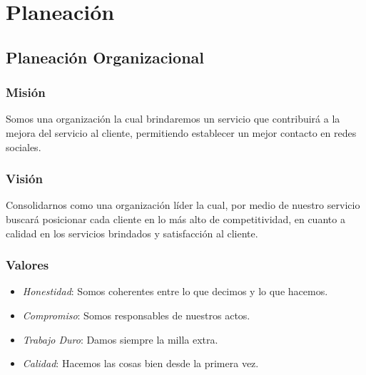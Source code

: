 \chapter{Planeaci\'on}
\section{Planeaci\'on Organizacional}
\subsection{Misi\'on}
Somos una organizaci\'on la cual brindaremos un servicio que  contribuir\'a a la mejora del servicio al  cliente, permitiendo establecer un mejor contacto en redes sociales.%
%
\subsection{Visi\'on}
Consolidarnos como una organizaci\'on l\'ider la cual, por medio de nuestro servicio buscar\'a posicionar cada cliente en lo m\'as alto de competitividad, en cuanto a calidad en los servicios brindados y satisfacci\'on al cliente.%
%
\subsection{Valores}
\begin{itemize}
\item \emph{Honestidad}: Somos coherentes entre lo que decimos y lo que hacemos.%
\item \emph{Compromiso}: Somos responsables de nuestros actos.%
\item \emph{Trabajo Duro}: Damos siempre la milla extra.%
\item \emph{Calidad}: Hacemos las cosas bien desde la primera vez.%
\end{itemize}
%
